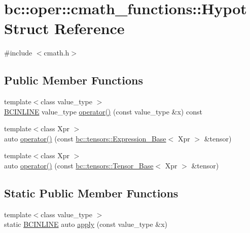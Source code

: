 \hypertarget{structbc_1_1oper_1_1cmath__functions_1_1Hypot}{}\section{bc\+:\+:oper\+:\+:cmath\+\_\+functions\+:\+:Hypot Struct Reference}
\label{structbc_1_1oper_1_1cmath__functions_1_1Hypot}


{\ttfamily \#include $<$cmath.\+h$>$}

\subsection*{Public Member Functions}
\begin{DoxyCompactItemize}
\item 
{\footnotesize template$<$class value\+\_\+type $>$ }\\\hyperlink{common_8h_a6699e8b0449da5c0fafb878e59c1d4b1}{B\+C\+I\+N\+L\+I\+NE} value\+\_\+type \hyperlink{structbc_1_1oper_1_1cmath__functions_1_1Hypot_ab8fa7883972ed34d4b34fd6610b6feac}{operator()} (const value\+\_\+type \&x) const
\item 
{\footnotesize template$<$class Xpr $>$ }\\auto \hyperlink{structbc_1_1oper_1_1cmath__functions_1_1Hypot_a435b7ec817e16b7f43c59925d558ef16}{operator()} (const \hyperlink{classbc_1_1tensors_1_1Expression__Base}{bc\+::tensors\+::\+Expression\+\_\+\+Base}$<$ Xpr $>$ \&tensor)
\item 
{\footnotesize template$<$class Xpr $>$ }\\auto \hyperlink{structbc_1_1oper_1_1cmath__functions_1_1Hypot_a6f7105f02ef66de5ef4ccdeac3a1e83c}{operator()} (const \hyperlink{classbc_1_1tensors_1_1Tensor__Base}{bc\+::tensors\+::\+Tensor\+\_\+\+Base}$<$ Xpr $>$ \&tensor)
\end{DoxyCompactItemize}
\subsection*{Static Public Member Functions}
\begin{DoxyCompactItemize}
\item 
{\footnotesize template$<$class value\+\_\+type $>$ }\\static \hyperlink{common_8h_a6699e8b0449da5c0fafb878e59c1d4b1}{B\+C\+I\+N\+L\+I\+NE} auto \hyperlink{structbc_1_1oper_1_1cmath__functions_1_1Hypot_a4f4b179ec9192cf36931c84abc3e3f5c}{apply} (const value\+\_\+type \&x)
\end{DoxyCompactItemize}


